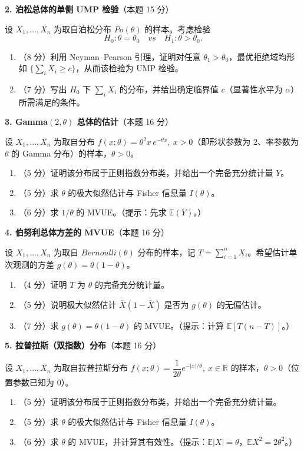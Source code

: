 \documentclass[12pt,a4paper]{ctexart}
\newcommand{\question}[2]{\bigskip\noindent\textbf{#1}\quad（本题 #2 分）\par\nobreak\medskip}
\newcommand{\E}{\mathbb{E}}
\begin{document}
\question{2. 泊松总体的单侧 UMP 检验}{15}
设 $X_1,\dots,X_n$ 为取自泊松分布 $Po(\theta)$ 的样本。考虑检验
\[ H_0:\theta=\theta_0 \quad vs \quad H_1:\theta>\theta_0. \]
\begin{enumerate}[label=(\arabic*),leftmargin=2.2em]
  \item （8 分）利用 Neyman--Pearson 引理，证明对任意 $\theta_1>\theta_0$，最优拒绝域均形如 $\{\sum_i X_i\ge c\}$，从而该检验为 UMP 检验。
  \item （7 分）写出 $H_0$ 下 $\sum_i X_i$ 的分布，并给出确定临界值 $c$（显著性水平为 $\alpha$）所需满足的条件。
\end{enumerate}

\question{3. Gamma$(2,\theta)$ 总体的估计}{16}
设 $X_1,\dots,X_n$ 为取自分布 $f(x;\theta)=\theta^2 x\,e^{-\theta x},\ x>0$（即形状参数为 $2$、率参数为 $\theta$ 的 Gamma 分布）的样本，$\theta>0$。
\begin{enumerate}[label=(\arabic*),leftmargin=2.2em]
  \item （5 分）证明该分布属于正则指数分布类，并给出一个完备充分统计量 $Y$。
  \item （5 分）求 $\theta$ 的极大似然估计与 Fisher 信息量 $I(\theta)$。
  \item （6 分）求 $1/\theta$ 的 MVUE。（提示：先求 $\E(Y)$。）
\end{enumerate}

\question{4. 伯努利总体方差的 MVUE}{16}
设 $X_1,\dots,X_n$ 为取自 $Bernoulli(\theta)$ 分布的样本，记 $T=\sum_{i=1}^n X_i$。希望估计单次观测的方差 $g(\theta)=\theta(1-\theta)$。
\begin{enumerate}[label=(\arabic*),leftmargin=2.2em]
  \item （4 分）证明 $T$ 为 $\theta$ 的完备充分统计量。
  \item （5 分）说明极大似然估计 $\bar X(1-\bar X)$ 是否为 $g(\theta)$ 的无偏估计。
  \item （7 分）求 $g(\theta)=\theta(1-\theta)$ 的 MVUE。（提示：计算 $\E[T(n-T)]$。）
\end{enumerate}

\question{5. 拉普拉斯（双指数）分布}{16}
设 $X_1,\dots,X_n$ 为取自拉普拉斯分布 $f(x;\theta)=\dfrac{1}{2\theta}e^{-|x|/\theta},\ x\in\mathbb R$ 的样本，$\theta>0$（位置参数已知为 $0$）。
\begin{enumerate}[label=(\arabic*),leftmargin=2.2em]
  \item （5 分）证明该分布属于正则指数分布类，并给出一个完备充分统计量。
  \item （5 分）求 $\theta$ 的极大似然估计与 Fisher 信息量 $I(\theta)$。
  \item （6 分）求 $\theta$ 的 MVUE，并计算其有效性。（提示：$\E|X|=\theta$，$\E X^2=2\theta^2$。）
\end{enumerate}
\end{document}
